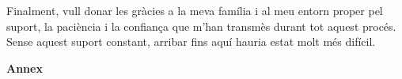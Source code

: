 \documentclass[a4paper,11pt, titlepage, twoside]{article}
\begin{document}
Finalment, vull donar les gràcies a la meva família i al meu entorn proper pel suport, la paciència i la confiança que m’han transmès durant tot aquest procés. Sense aquest suport constant, arribar fins aquí hauria estat molt més difícil.


\printbibliography[heading=bibintoc, title={Bibliografia}]

\newpage
\thispagestyle{empty} %
\vspace*{\fill}
\begin{center}
	{\Huge\bfseries Annex}
\end{center}
\vspace*{\fill}
\newpage

\end{document}
